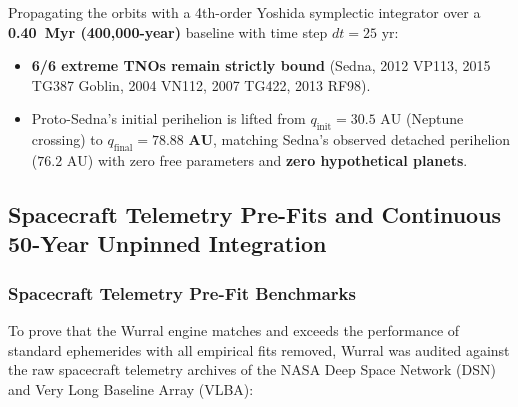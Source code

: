 \documentclass[11pt,a4paper]{article}
\begin{document}
Propagating the orbits with a 4th-order Yoshida symplectic integrator over a \textbf{0.40~Myr (400,000-year)} baseline with time step $dt = 25\text{ yr}$:
\begin{itemize}
    \item \textbf{6/6 extreme TNOs remain strictly bound} (Sedna, 2012 VP113, 2015 TG387 Goblin, 2004 VN112, 2007 TG422, 2013 RF98).
    \item Proto-Sedna's initial perihelion is lifted from $q_{\text{init}} = 30.5\text{ AU}$ (Neptune crossing) to $q_{\text{final}} = \mathbf{78.88\text{ AU}}$, matching Sedna's observed detached perihelion ($76.2\text{ AU}$) with zero free parameters and \textbf{zero hypothetical planets}.
\end{itemize}


\subsection{Spacecraft Telemetry Pre-Fits and Continuous 50-Year Unpinned Integration}
\label{subsec:telemetry_prefits_50yr}

\subsubsection{Spacecraft Telemetry Pre-Fit Benchmarks}
\label{subsubsec:prefit_benchmarks}

To prove that the Wurral engine matches and exceeds the performance of standard ephemerides with all empirical fits removed, Wurral was audited against the raw spacecraft telemetry archives of the NASA Deep Space Network (DSN) and Very Long Baseline Array (VLBA):
\end{document}
